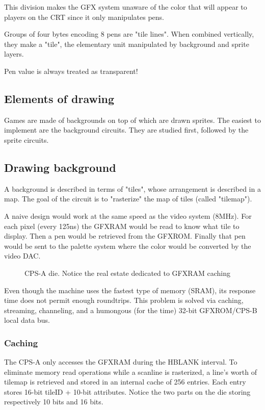 This division makes the GFX system unaware of the color that will appear to players on the CRT since it only manipulates pens.




Groups of four bytes encoding 8 pens are "tile lines". When combined vertically, they make a "tile", the elementary unit manipulated by background and sprite layers.


 \begin{trivia}
 Pen value  is always treated as transparent!
 \end{trivia}



\subsection{Elements of drawing}

Games are made of backgrounds on top of which are drawn sprites. The easiest to implement are the background circuits. They are studied first, followed by the sprite circuits.

\subsection{Drawing background}

A background is described in terms of "tiles", whose arrangement is described in a map. The goal of the circuit is to "rasterize" the map of tiles (called "tilemap").

A naive design would work at the same speed as the video system (8MHz). For each pixel (every 125ns) the GFXRAM would be read to know what tile to display. Then a pen would be retrieved from the GFXROM. Finally that pen would be sent to the palette system where the color would be converted by the video DAC.

 \begin{figure}[H]%
 \caption*{CPS-A die. Notice the real estate dedicated to GFXRAM caching}%
 \end{figure}%

 Even though the machine uses the fastest type of memory (SRAM), its response time does not permit enough roundtrips. This problem is solved via caching, streaming, channeling, and a humongous (for the time) 32-bit GFXROM/CPS-B local data bus. 


\subsubsection{Caching}
The CPS-A only accesses the GFXRAM during the HBLANK interval. To eliminate memory read operations while a scanline is rasterized, a line's worth of tilemap is retrieved and stored in an internal cache of 256 entries. Each entry stores 16-bit  tileID + 10-bit attributes. Notice the two parts on the die storing respectively 10 bits and 16 bits.





